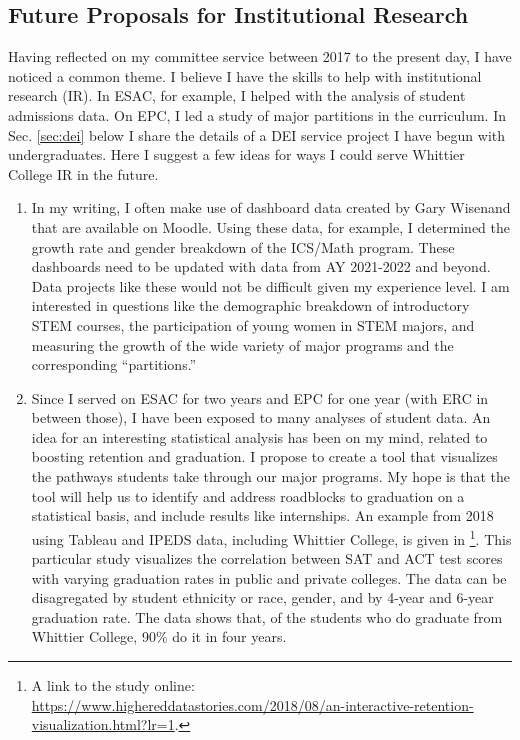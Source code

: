 \documentclass[../../../main.tex]{subfiles}
\begin{document}
\subsection{Future Proposals for Institutional Research}

Having reflected on my committee service between 2017 to the present day, I have noticed a common theme.  I believe I have the skills to help with institutional research (IR).  In ESAC, for example, I helped with the analysis of student admissions data.  On EPC, I led a study of major partitions in the curriculum.  In Sec. \ref{sec:dei} below I share the details of a DEI service project I have begun with undergraduates.  Here I suggest a few ideas for ways I could serve Whittier College IR in the future.
\begin{enumerate}
\item In my writing, I often make use of dashboard data created by Gary Wisenand that are available on Moodle.  Using these data, for example, I determined the growth rate and gender breakdown of the ICS/Math program.  These dashboards need to be updated with data from AY 2021-2022 and beyond.  Data projects like these would not be difficult given my experience level.  I am interested in questions like the demographic breakdown of introductory STEM courses, the participation of young women in STEM majors, and measuring the growth of the wide variety of major programs and the corresponding ``partitions.''
\item Since I served on ESAC for two years and EPC for one year (with ERC in between those), I have been exposed to many analyses of student data.  An idea for an interesting statistical analysis has been on my mind, related to boosting retention and graduation.  I propose to create a tool that visualizes the pathways students take through our major programs.  My hope is that the tool will help us to identify and address roadblocks to graduation on a statistical basis, and include results like internships.  An example from 2018 using Tableau and IPEDS data, including Whittier College, is given in \cite{tableau}\footnote{A link to the study online: \url{https://www.highereddatastories.com/2018/08/an-interactive-retention-visualization.html?lr=1}.}.  This particular study visualizes the correlation between SAT and ACT test scores with varying graduation rates in public and private colleges.  The data can be disagregated by student ethnicity or race, gender, and by 4-year and 6-year graduation rate.  The data shows that, of the students who do graduate from Whittier College, 90\% do it in four years.
\end{enumerate}
\end{document}
